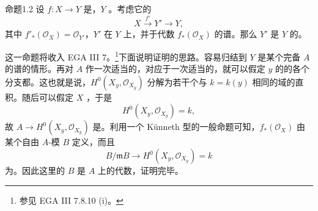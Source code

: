 \begin{SGAresult}{命题}{1.2}
设 $f:X\to Y$ 是，$Y$ 。考虑它的
\[
X\xrightarrow{f'}Y'\longrightarrow Y,
\]
其中 $f'_*(\mathcal O_X)=\mathcal O_{Y'}$，$Y'$ 在 $Y$ 上，并于代数 $f_*(\mathcal O_X)$ 的谱。那么 $Y'$ 是 $Y$ 的。
\end{SGAresult}
这一命题将收入 EGA III 7。\footnote{参见 EGA III 7.8.10 (i)。}下面说明证明的思路。容易归结到 $Y$ 是某个完备 $A$ 的谱的情形。再对 $A$ 作一次适当的，对应于一次适当的，就可以假定 $y$ 的的各个分支都。这也就是说，$H^0(X_y,\mathcal O_{X_y})$ 分解为若干个与 $k=k(y)$ 相同的域的直积。随后可以假定 $X$ ，于是
\[
H^0(X_y,\mathcal O_{X_y})=k,
\]
故 $A\to H^0(X_y,\mathcal O_{X_y})$ 是。利用一个 Künneth 型的一般命题可知，$f_*(\mathcal O_X)$ 由某个自由 $A$-模 $B$ 定义，而且
\[
B/\mathfrak mB\longrightarrow H^0(X_y,\mathcal O_{X_y})=k
\]
为。因此这里的 $B$ 是 $A$ 上的代数，证明完毕。

